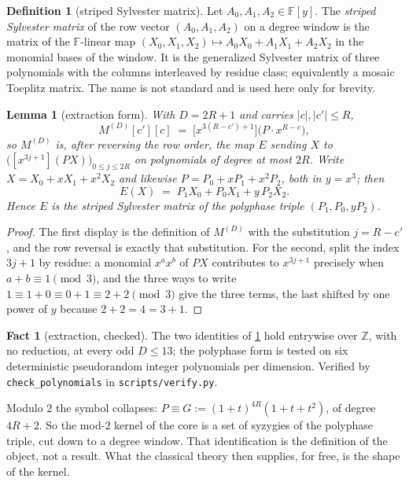 \documentclass[11pt]{amsart}
\newtheorem{lemma}[theorem]{Lemma}
\theoremstyle{definition}
\newtheorem{definition}[theorem]{Definition}
\newtheorem{fact}[theorem]{Fact}
\theoremstyle{remark}
\begin{document}
\begin{definition}[striped Sylvester matrix]
\label{b:def:striped}
Let $A_0, A_1, A_2 \in \mathbb{F}[y]$. The \emph{striped Sylvester matrix} of the row vector $(A_0, A_1, A_2)$ on a degree window is the matrix of the $\mathbb{F}$-linear map $(X_0, X_1, X_2) \mapsto A_0 X_0 + A_1 X_1 + A_2 X_2$ in the monomial bases of the window. It is the generalized Sylvester matrix of three polynomials with the columns interleaved by residue class; equivalently a mosaic Toeplitz matrix. The name is not standard and is used here only for brevity.
\end{definition}

\begin{lemma}[extraction form]
\label{b:lem:extract}
With $D = 2R+1$ and carries $|c|, |c'| \le R$,
\[
  M^{(D)}[c'][c] \;=\; \bigl[x^{3(R-c')+1}\bigr]\bigl(P \cdot x^{R-c}\bigr),
\]
so $M^{(D)}$ is, after reversing the row order, the map $E$ sending $X$ to $\bigl([x^{3j+1}](PX)\bigr)_{0 \le j \le 2R}$ on polynomials of degree at most $2R$. Write $X = X_0 + xX_1 + x^2X_2$ and likewise $P = P_0 + xP_1 + x^2P_2$, both in $y = x^3$; then
\[
  E(X) \;=\; P_1 X_0 + P_0 X_1 + y\,P_2 X_2 .
\]
Hence $E$ is the striped Sylvester matrix of the polyphase triple $(P_1, P_0, y P_2)$.
\end{lemma}

\begin{proof}
The first display is the definition of $M^{(D)}$ with the substitution $j = R - c'$, and the row reversal is exactly that substitution. For the second, split the index $3j+1$ by residue: a monomial $x^{a}x^{b}$ of $PX$ contributes to $x^{3j+1}$ precisely when $a + b \equiv 1 \pmod 3$, and the three ways to write $1 \equiv 1+0 \equiv 0+1 \equiv 2+2 \pmod 3$ give the three terms, the last shifted by one power of $y$ because $2 + 2 = 4 = 3 + 1$.
\end{proof}

\begin{fact}[extraction, checked]
\label{b:fact:extract}
The two identities of \cref{b:lem:extract} hold entrywise over $\mathbb{Z}$, with no reduction, at every odd $D \le 13$; the polyphase form is tested on six deterministic pseudorandom integer polynomials per dimension. Verified by \texttt{check\_polynomials} in \texttt{scripts/verify.py}.
\end{fact}

Modulo $2$ the symbol collapses: $P \equiv G := (1+t)^{4R}(1+t+t^2)$, of degree $4R+2$. So the mod-$2$ kernel of the core is a set of syzygies of the polyphase triple, cut down to a degree window. That identification is the definition of the object, not a result. What the classical theory then supplies, for free, is the shape of the kernel.
\end{document}

